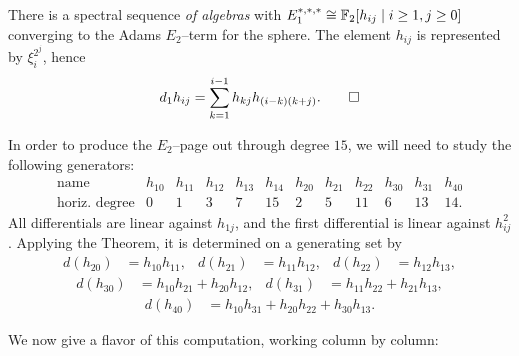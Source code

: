 \begin{theorem}[May]
There is a spectral sequence \emph{of algebras} with $E_1^{*, *, *} \cong \mathbb F_2[h_{ij} \mid i \ge 1, j \ge 0]$ converging to the Adams $E_2$--term for the sphere.
The element $h_{ij}$ is represented by $\xi_i^{2^j}$, hence \[d_1 h_{ij} = \sum_{k=1}^{i-1} h_{kj} h_{(i-k)(k+j)}. \qed \]
\end{theorem}

In order to produce the $E_2$--page out through degree $15$, we will need to study the following generators:
\[\begin{array}{c|ccccccccccc}
\text{name} & h_{10} & h_{11} & h_{12} & h_{13} & h_{14} & h_{20} & h_{21} & h_{22} & h_{30} & h_{31} & h_{40} \\
\text{horiz.\ degree} & 0 & 1 & 3 & 7 & 15 & 2 & 5 & 11 & 6 & 13 & 14. \end{array}\]
All differentials are linear against $h_{1j}$, and the first differential is linear against $h_{ij}^2$.
Applying the Theorem, it is determined on a generating set by
\begin{align*}
d(h_{20}) & = h_{10} h_{11}, &
d(h_{21}) & = h_{11} h_{12}, &
d(h_{22}) & = h_{12} h_{13},
\end{align*} \vspace{-2\baselineskip}
\begin{align*}
d(h_{30}) & = h_{10} h_{21} + h_{20} h_{12}, &
d(h_{31}) & = h_{11} h_{22} + h_{21} h_{13},
\end{align*} \vspace{-2\baselineskip}
\begin{align*}
d(h_{40}) & = h_{10} h_{31} + h_{20} h_{22} + h_{30} h_{13}.
\end{align*}

We now give a flavor of this computation, working column by column:


